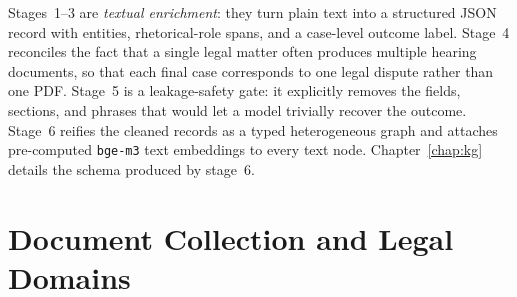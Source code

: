 Stages~1--3 are \emph{textual enrichment}: they turn plain text into a
structured JSON record with entities, rhetorical-role spans, and a
case-level outcome label. Stage~4 reconciles the fact that a single
legal matter often produces multiple hearing documents, so that each
final case corresponds to one legal dispute rather than one PDF. Stage~5
is a leakage-safety gate: it explicitly removes the fields, sections,
and phrases that would let a model trivially recover the outcome.
Stage~6 reifies the cleaned records as a typed heterogeneous graph and
attaches pre-computed \texttt{bge-m3} text embeddings to every text
node. Chapter~\ref{chap:kg} details the schema produced by stage~6.

\section{Document Collection and Legal Domains}

